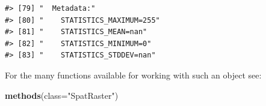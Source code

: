 \documentclass[
]{book}
\newenvironment{Shaded}{\begin{snugshade}}{\end{snugshade}}
\newcommand{\AttributeTok}[1]{\textcolor[rgb]{0.13,0.29,0.53}{#1}}
\newcommand{\FunctionTok}[1]{\textcolor[rgb]{0.13,0.29,0.53}{\textbf{#1}}}
\newcommand{\NormalTok}[1]{#1}
\newcommand{\StringTok}[1]{\textcolor[rgb]{0.31,0.60,0.02}{#1}}
\begin{document}
\begin{verbatim}
#> [79] "  Metadata:"                                                                                                                                                                                                                                                                    
#> [80] "    STATISTICS_MAXIMUM=255"                                                                                                                                                                                                                                                     
#> [81] "    STATISTICS_MEAN=nan"                                                                                                                                                                                                                                                        
#> [82] "    STATISTICS_MINIMUM=0"                                                                                                                                                                                                                                                       
#> [83] "    STATISTICS_STDDEV=nan"
\end{verbatim}

For the many functions available for working with such an object see:

\begin{Shaded}
\begin{Highlighting}[]
\FunctionTok{methods}\NormalTok{(}\AttributeTok{class=}\StringTok{"SpatRaster"}\NormalTok{)}
\end{Highlighting}
\end{Shaded}
\end{document}
